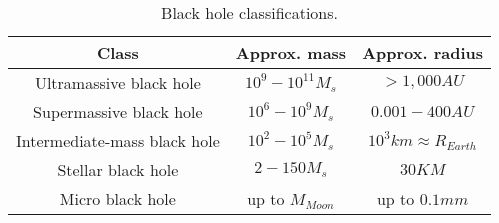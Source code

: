 \begin{table}[hb]
\centering
\begin{tabular}{||c | c | c |} 
 \hline
 Class & Approx. mass & Approx. radius \\ [0.5ex] 
 \hline\hline
 Ultramassive black hole & $10^9-10^{11} M_s$ & $>1,000AU$ \\ 
 \hline
 Supermassive black hole & $10^6-10^9 M_s$ & $0.001-400AU$ \\
 \hline
 Intermediate-mass black hole & $10^2-10^5 M_s$ & $10^3km\approx R_{Earth}$ \\
 \hline
 Stellar black hole & $2-150 M_s$ & $30 KM$ \\
 \hline
 Micro black hole & up to $M_{Moon}$ & up to $0.1mm$ \\
 \hline\hline
\end{tabular}
\label{tab:bl}
\caption{Black hole classifications.}
\end{table}